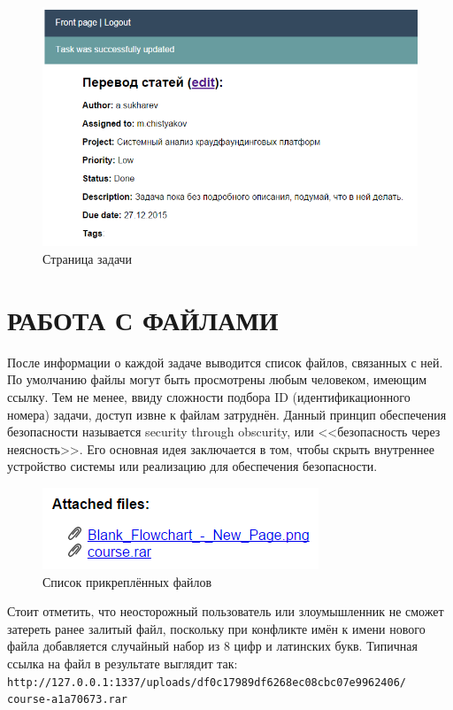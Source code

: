 \documentclass[14pt, a4paper]{extreport}
\begin{document}
\begin{figure}[!htb]
  \centering
    \includegraphics[scale=0.4]{../shared_images/frontend/task-view.png}
   \caption{Страница задачи}
    \label{fig:start}
\end{figure}

\section{\MakeTextUppercase{Работа с файлами}}

После информации о каждой задаче выводится список файлов, связанных с ней. По умолчанию файлы могут быть просмотрены любым человеком, имеющим ссылку. Тем не менее, ввиду сложности подбора ID (идентификационного номера) задачи, доступ извне к файлам затруднён. Данный принцип обеспечения безопасности называется security through obscurity, или <<безопасность через неясность>>. Его основная идея заключается в том, чтобы скрыть внутреннее устройство системы или реализацию для обеспечения безопасности.

\begin{figure}[!htb]
  \centering
    \includegraphics[scale=0.75]{../shared_images/frontend/files.png}
   \caption{Список прикреплённых файлов}
    \label{fig:start}
\end{figure}

Стоит отметить, что неосторожный пользователь или злоумышленник не сможет затереть ранее залитый файл, поскольку при конфликте имён к имени нового файла добавляется случайный набор из 8 цифр и латинских букв. Типичная ссылка на файл в результате выглядит так: \\
{\tt http://127.0.0.1:1337/uploads/df0c17989df6268ec08cbc07e9962406/ \\
course-a1a70673.rar}
\end{document}
